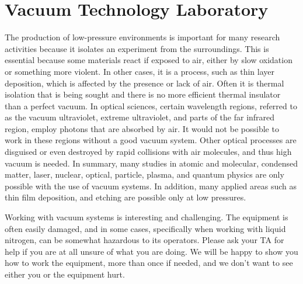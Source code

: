 





\chapter{Vacuum Technology Laboratory}

The production of low-pressure environments is important for many research activities because it isolates an experiment from the surroundings. This is essential because some materials react if exposed to air, either by slow oxidation or something more violent. In other cases, it is a process, such as thin layer deposition, which is affected by the presence or lack of air. Often it is thermal isolation that is being sought and there is no more efficient thermal insulator than a perfect vacuum. In optical sciences, certain wavelength regions, referred to as the vacuum ultraviolet, extreme ultraviolet, and parts of the far infrared region, employ photons that are absorbed by air. It would not be possible to work in these regions without a good vacuum system. Other optical processes are disguised or even destroyed by rapid collisions with air molecules, and thus high vacuum is needed. In summary, many studies in atomic and molecular, condensed matter, laser, nuclear, optical, particle, plasma, and quantum physics are only possible with the use of vacuum systems. In addition, many applied areas such as thin film deposition, and etching are possible only at low pressures.

Working with vacuum systems is interesting and challenging. The equipment is often easily damaged, and in some cases, specifically when working with liquid nitrogen, can be somewhat hazardous to its operators. Please ask your TA for help if you are at all unsure of what you are doing. We will be happy to show you how to work the equipment, more than once if needed, and we don't want to see either you or the equipment hurt.

